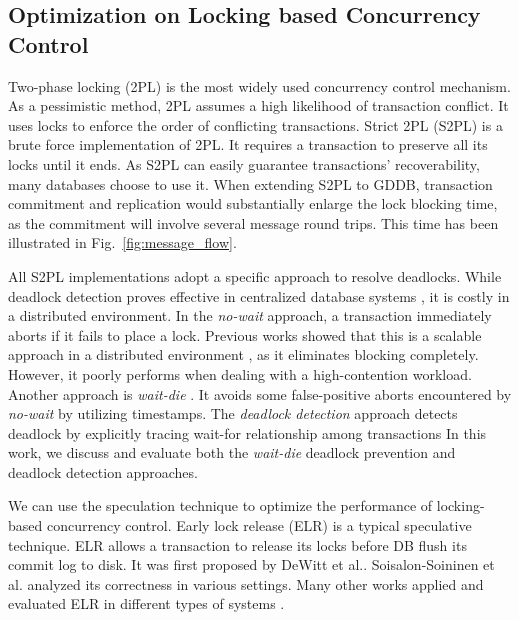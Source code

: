 \documentclass[conference]{IEEEtran}
\begin{document}
\subsection{Optimization on Locking based Concurrency Control}
Two-phase locking (2PL) is the most widely used concurrency control mechanism.
As a pessimistic method, 2PL assumes a high likelihood of transaction conflict.
It uses locks to enforce the order of conflicting transactions.
Strict 2PL (S2PL) is a brute force implementation of 2PL.
It requires a transaction to preserve all its locks until it ends.
As S2PL can easily guarantee transactions' recoverability, many databases choose to use it.
When extending S2PL to GDDB, transaction commitment and replication would substantially enlarge the lock blocking time,
as the commitment will involve several message round trips. 
This time has been illustrated in Fig.~\ref{fig:message_flow}.

All S2PL implementations adopt a specific approach to resolve deadlocks.
While deadlock detection proves effective in centralized database systems \cite{MySQL}\cite{PostgreSQL}, it is costly in a distributed environment.
In the \emph{no-wait}
\cite{EvaluationOfCC:journals/pvldb/HardingAPS17}
approach, a transaction immediately aborts if it fails to place a lock.
Previous works showed that this is a scalable approach in a distributed environment \cite{EvaluationCC1000Cores:journals/pvldb/YuBPDS14}\cite{EvaluationOfCC:journals/pvldb/HardingAPS17},
as it eliminates blocking completely.
However, it poorly performs when dealing with a high-contention workload.
Another approach is \emph{wait-die} \cite{LockNoWait:journals/csur/BernsteinG81}.
It avoids some false-positive aborts encountered by \emph{no-wait} by utilizing timestamps.
The \emph{deadlock detection} approach \cite{LockCC:conf/ds/GrayLPT76} detects deadlock by explicitly tracing wait-for relationship among transactions
In this work, we discuss and evaluate both the \emph{wait-die} deadlock prevention and deadlock detection approaches.


We can use the speculation technique to optimize the performance of locking-based concurrency control.
Early lock release (ELR)
\cite{EfficientLocking:conf/vldb/KimuraGK12}
\cite{ELR:dewitt_implementation_1984}
\cite{PS2PL:conf/icdt/Soisalon-SoininenY95}
\cite{Aether:journals/pvldb/JohnsonPSAA10}
\cite{Actor-Oriented-DB:conf/icde/Bernstein18}
is a typical speculative technique.
ELR allows a transaction to release its locks before DB flush its commit log to disk.
It was first proposed by DeWitt et al.\cite{ELR:dewitt_implementation_1984}.
Soisalon-Soininen et al. \cite{PS2PL:conf/icdt/Soisalon-SoininenY95} analyzed its correctness in various settings.
Many other works applied and evaluated ELR in different types of systems
\cite{EfficientLocking:conf/vldb/KimuraGK12}
\cite{Aether:journals/pvldb/JohnsonPSAA10}.
\end{document}
